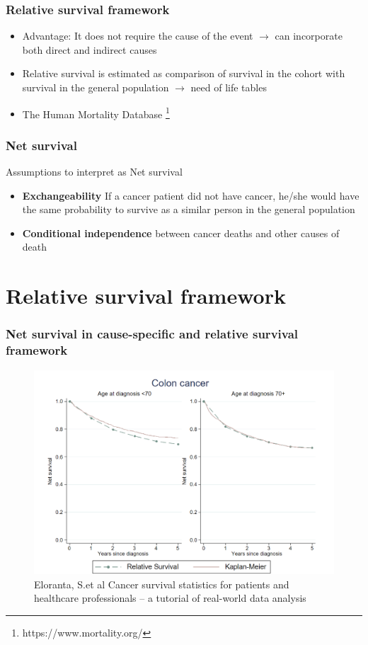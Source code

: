 \documentclass{beamer}
\begin{document}
\begin{frame}
\frametitle{Relative survival framework}

\begin{itemize}
\item Advantage: It does not require the cause of the event $\rightarrow$ can incorporate both direct and indirect causes


\item Relative survival is estimated as comparison of survival in the cohort with survival in the general population $\rightarrow$ {need of life tables} 

\item The Human Mortality Database \footnote{https://www.mortality.org/}
\end{itemize}
\end{frame}

\begin{frame}
\frametitle{Net survival}
Assumptions to interpret as Net survival
\begin{itemize}
    \item \textbf{Exchangeability} If a cancer patient did not have cancer, he/she would have the same probability to survive as a similar person in the general population
    
    \item \textbf{Conditional independence} between cancer deaths and other causes of death 
\end{itemize}

\section{Relative survival framework}
\end{frame}

\begin{frame}
\frametitle{\small{Net survival in cause-specific and relative survival framework}}
\begin{figure}
\centering
    \includegraphics[scale = 0.3]{pic2.png}
\caption{Eloranta, S.et al Cancer survival statistics for patients and healthcare professionals – a tutorial of real-world data analysis}
\label{fig1}
\end{figure}
\end{frame}
\end{document}
